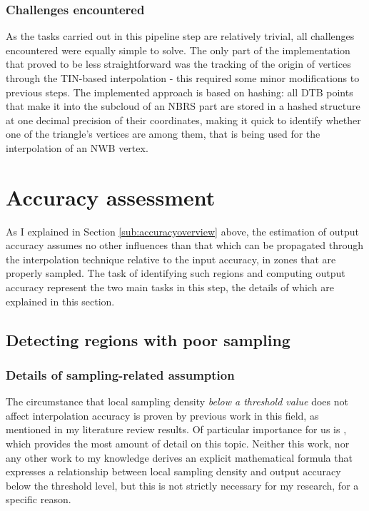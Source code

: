\subsubsection{Challenges encountered}

As the tasks carried out in this pipeline step are relatively trivial, all challenges encountered were equally simple to solve. The only part of the implementation that proved to be less straightforward was the tracking of the origin of vertices through the TIN-based interpolation - this required some minor modifications to previous steps. The implemented approach is based on hashing: all DTB points that make it into the subcloud of an NBRS part are stored in a hashed structure at one decimal precision of their coordinates, making it quick to identify whether one of the triangle's vertices are among them, that is being used for the interpolation of an NWB vertex.

\section{Accuracy assessment}
\label{sec:m_accuracyassessment}

As I explained in Section \ref{sub:accuracyoverview} above, the estimation of output accuracy assumes no other influences than that which can be propagated through the interpolation technique relative to the input accuracy, in zones that are properly sampled. The task of identifying such regions and computing output accuracy represent the two main tasks in this step, the details of which are explained in this section.

\subsection{Detecting regions with poor sampling}
\label{sub:m_accuracypoorsampling}

\subsubsection{Details of sampling-related assumption}

The circumstance that local sampling density \textit{below a threshold value} does not affect interpolation accuracy is proven by previous work in this field, as mentioned in my literature review results. Of particular importance for us is \cite{guo_etal_2010}, which provides the most amount of detail on this topic. Neither this work, nor any other work to my knowledge derives an explicit mathematical formula that expresses a relationship between local sampling density and output accuracy below the threshold level, but this is not strictly necessary for my research, for a specific reason.

